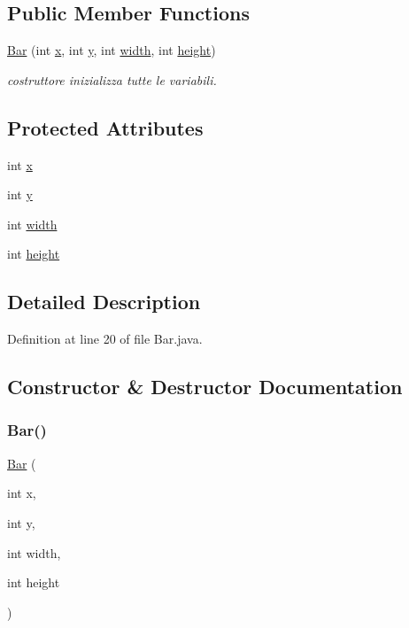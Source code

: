 \subsection*{Public Member Functions}
\begin{DoxyCompactItemize}
\item 
\hyperlink{classui_1_1_bar_a9048e88559d1d799814949815b2ab2d9}{Bar} (int \hyperlink{classui_1_1_bar_a6150e0515f7202e2fb518f7206ed97dc}{x}, int \hyperlink{classui_1_1_bar_a0a2f84ed7838f07779ae24c5a9086d33}{y}, int \hyperlink{classui_1_1_bar_a2474a5474cbff19523a51eb1de01cda4}{width}, int \hyperlink{classui_1_1_bar_ad12fc34ce789bce6c8a05d8a17138534}{height})
\begin{DoxyCompactList}\small\item\em costruttore inizializza tutte le variabili. \end{DoxyCompactList}\end{DoxyCompactItemize}
\subsection*{Protected Attributes}
\begin{DoxyCompactItemize}
\item 
int \hyperlink{classui_1_1_bar_a6150e0515f7202e2fb518f7206ed97dc}{x}
\item 
int \hyperlink{classui_1_1_bar_a0a2f84ed7838f07779ae24c5a9086d33}{y}
\item 
int \hyperlink{classui_1_1_bar_a2474a5474cbff19523a51eb1de01cda4}{width}
\item 
int \hyperlink{classui_1_1_bar_ad12fc34ce789bce6c8a05d8a17138534}{height}
\end{DoxyCompactItemize}


\subsection{Detailed Description}


Definition at line 20 of file Bar.\+java.



\subsection{Constructor \& Destructor Documentation}
\mbox{\label{classui_1_1_bar_a9048e88559d1d799814949815b2ab2d9}} 
\subsubsection{\texorpdfstring{Bar()}{Bar()}}
{\footnotesize\ttfamily \hyperlink{classui_1_1_bar}{Bar} (\begin{DoxyParamCaption}\item[{int}]{x,  }\item[{int}]{y,  }\item[{int}]{width,  }\item[{int}]{height }\end{DoxyParamCaption})}



